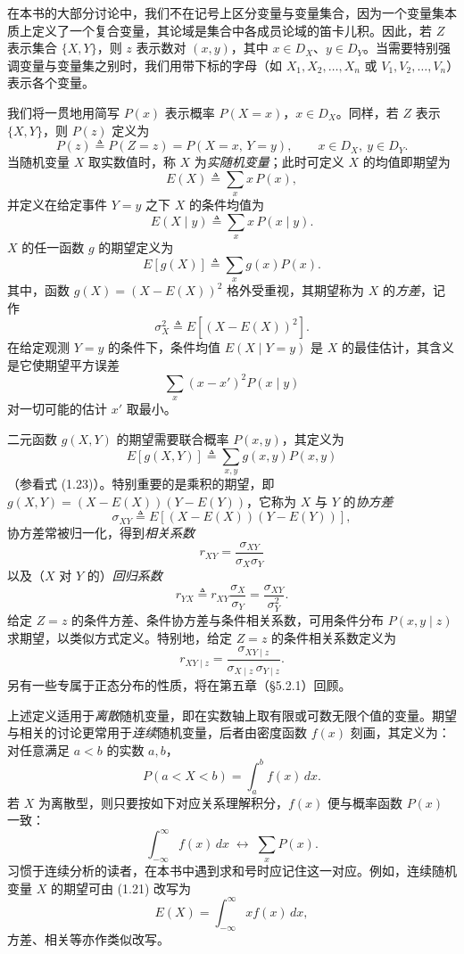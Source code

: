 在本书的大部分讨论中，我们不在记号上区分变量与变量集合，因为一个变量集本质上定义了一个复合变量，其论域是集合中各成员论域的笛卡儿积。因此，若 $Z$ 表示集合 $\{X,Y\}$，则 $z$ 表示数对 $(x,y)$，其中 $x\in D_X$、$y\in D_Y$。当需要特别强调变量与变量集之别时，我们用带下标的字母（如 $X_1,X_2,\dots,X_n$ 或 $V_1,V_2,\dots,V_n$）表示各个变量。

我们将一贯地用简写 $P(x)$ 表示概率 $P(X=x)$，$x\in D_X$。同样，若 $Z$ 表示 $\{X,Y\}$，则 $P(z)$ 定义为
\[
P(z) \triangleq P(Z=z) = P(X=x,\,Y=y),\qquad x\in D_X,\ y\in D_Y .
\]
当随机变量 $X$ 取实数值时，称 $X$ 为\emph{实随机变量}；此时可定义 $X$ 的均值即期望为
\begin{equation}
E(X) \triangleq \sum_x x\,P(x), \tag{1.21}
\end{equation}
并定义在给定事件 $Y=y$ 之下 $X$ 的条件均值为
\begin{equation}
E(X\mid y) \triangleq \sum_x x\,P(x\mid y). \tag{1.22}
\end{equation}
$X$ 的任一函数 $g$ 的期望定义为
\begin{equation}
E[g(X)] \triangleq \sum_x g(x)P(x). \tag{1.23}
\end{equation}
其中，函数 $g(X)=(X-E(X))^2$ 格外受重视，其期望称为 $X$ 的\emph{方差}，记作
\[
\sigma_X^2 \triangleq E[(X-E(X))^2].
\]
在给定观测 $Y=y$ 的条件下，条件均值 $E(X\mid Y=y)$ 是 $X$ 的最佳估计，其含义是它使期望平方误差
\[
\sum_{x} (x-x')^2 P(x\mid y)
\]
对一切可能的估计 $x'$ 取最小。

二元函数 $g(X,Y)$ 的期望需要联合概率 $P(x,y)$，其定义为
\[
E[g(X,Y)] \triangleq \sum_{x,y} g(x,y)P(x,y)
\]
（参看式 \textup{(1.23)}）。特别重要的是乘积的期望，即 $g(X,Y)=(X-E(X))(Y-E(Y))$，它称为 $X$ 与 $Y$ 的\emph{协方差}
\[
\sigma_{XY} \triangleq E[(X-E(X))(Y-E(Y))],
\]
协方差常被归一化，得到\emph{相关系数}
\[
r_{XY} = \frac{\sigma_{XY}}{\sigma_X \sigma_Y}
\]
以及（$X$ 对 $Y$ 的）\emph{回归系数}
\[
r_{YX} \triangleq r_{XY}\frac{\sigma_X}{\sigma_Y} = \frac{\sigma_{XY}}{\sigma_Y^2}.
\]
给定 $Z=z$ 的条件方差、条件协方差与条件相关系数，可用条件分布 $P(x,y\mid z)$ 求期望，以类似方式定义。特别地，给定 $Z=z$ 的条件相关系数定义为
\begin{equation}
r_{XY\mid z} = \frac{\sigma_{XY\mid z}}{\sigma_{X\mid z}\,\sigma_{Y\mid z}}. \tag{1.24}
\end{equation}
另有一些专属于正态分布的性质，将在第五章（\S 5.2.1）回顾。

上述定义适用于\emph{离散}随机变量，即在实数轴上取有限或可数无限个值的变量。期望与相关的讨论更常用于\emph{连续}随机变量，后者由密度函数 $f(x)$ 刻画，其定义为：对任意满足 $a<b$ 的实数 $a,b$，
\[
P(a<X<b) = \int_a^b f(x)\,dx .
\]
若 $X$ 为离散型，则只要按如下对应关系理解积分，$f(x)$ 便与概率函数 $P(x)$ 一致：
\begin{equation}
\int_{-\infty}^{\infty} f(x)\,dx \;\longleftrightarrow\; \sum_x P(x). \tag{1.25}
\end{equation}
习惯于连续分析的读者，在本书中遇到求和号时应记住这一对应。例如，连续随机变量 $X$ 的期望可由 \textup{(1.21)} 改写为
\[
E(X) = \int_{-\infty}^{\infty} x f(x)\,dx,
\]
方差、相关等亦作类似改写。

